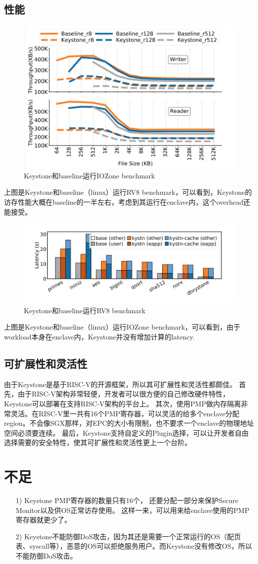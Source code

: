 \subsection{性能}
\begin{figure}[]
    \centering
    \includegraphics[width=1\textwidth]{memory-eval.png}    
    \caption{Keystone和baseline运行IOZone benchmark}
\end{figure}
上图是Keystone和baseline（linux）运行RV8 benchmark，可以看到，Keystone的访存性能大概在baseline的一半左右，考虑到其运行在enclave内，这个overhead还能接受。
\begin{figure}[]
    \centering
    \includegraphics[width=1\textwidth]{calculation-eval.png}    
    \caption{Keystone和baseline运行RV8 benchmark}
\end{figure}
上图是Keystone和baseline（linux）运行IOZone benchmark，可以看到，由于workload本身在enclave内，Keystone并没有增加计算的latency.
\subsection{可扩展性和灵活性}
由于Keystone是基于RISC-V的开源框架，所以其可扩展性和灵活性都颇佳。
首先，由于RISC-V架构非常轻便，开发者可以很方便的自己修改硬件特性，Keystone可以部署在支持RISC-V架构的平台上。
其次，使用PMP做内存隔离非常灵活。在RISC-V里一共有16个PMP寄存器，可以灵活的给多个enclave分配region。不会像SGX那样，对EPC的大小有限制，也不要求一个enclave的物理地址空间必须要连续。
最后，Keystone支持自定义的Plugin选择，可以让开发者自由选择需要的安全特性，使其可扩展性和灵活性更上一个台阶。

\section{不足}
\begin{itemize}
	\item [1)]
	Keystone PMP寄存器的数量只有16个，
	还要分配一部分来保护Secure Monitor以及供OS正常访存使用。
	这样一来，可以用来给enclave使用的PMP寄存器就更少了。
	\item [2)]
	Keystone不能防御DoS攻击，因为其还是需要一个正常运行的OS（配页表、syscall等），恶意的OS可以拒绝服务用户。而Keystone没有修改OS，所以不能防御DoS攻击。
\end{itemize}